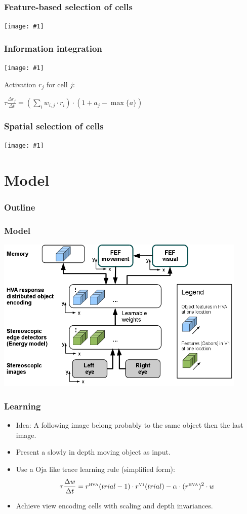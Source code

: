 \documentclass[12]{beamer}
\newcommand{\Area}[1]{^{\mbox{\tiny #1}}}
\newcommand{\showGrafic}[2]{
	\begin{center}
		\texttt{[image: \#1]}
	\end{center}
}
\begin{document}
\begin{frame}
  	\frametitle{Feature-based selection of cells}
	\showGrafic{featureSelection}{0.9}
\end{frame}

\begin{frame}
  	\frametitle{Information integration}
	\showGrafic{attention}{0.8}
	Activation $r_j$ for cell $j$:
        \begin{center}
	  $\tau \frac{\Delta r_j}{\Delta t} = (\sum_i w_{i,j} \cdot r_i ) \cdot (1+a_j-\max\{a\})$
	\end{center}
\end{frame}

\begin{frame}
	\frametitle{Spatial selection of cells}
	\showGrafic{spatialSelection}{0.9}
\end{frame}

		
\section{Model}
%
\begin{frame}
  \frametitle{Outline}
  \tableofcontents[currentsection]
\end{frame}

\begin{frame}
  \frametitle{Model}
 \begin{center}
    \vspace{0.5em}
  \includegraphics[width=0.9\textwidth]{overviewCore3}
\end{center}
\end{frame}

\begin{frame}
  \frametitle{Learning}
  \begin{itemize}
   \item Idea: A following image belong probably to the same object then the last image.
   \item Present a slowly in depth moving object as input.   
   \item Use a Oja like trace learning rule (simplified form):
      $$\tau \frac{\Delta w}{\Delta t} = r\Area{HVA} (trial-1) \cdot r\Area{V1}(trial) - \alpha \cdot (r\Area{HVA})^2 \cdot w $$
   \item Achieve view encoding cells with scaling and depth invariances.
  \end{itemize}
\end{frame}
\end{document}
